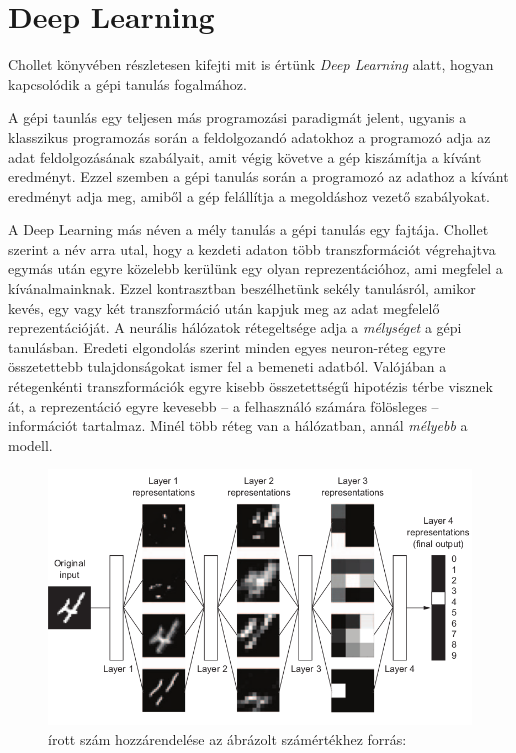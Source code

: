 \section{Deep Learning}
Chollet könyvében részletesen kifejti mit is értünk \emph{Deep Learning} alatt, hogyan kapcsolódik a gépi tanulás fogalmához.\cite{chollet}

A gépi taunlás egy teljesen más programozási paradigmát jelent, ugyanis a klasszikus programozás során a feldolgozandó adatokhoz a programozó adja az adat feldolgozásának szabályait, amit végig követve a gép kiszámítja a kívánt eredményt. Ezzel szemben a gépi tanulás során a programozó az adathoz  a kívánt eredményt adja meg, amiből a gép felállítja a megoldáshoz vezető szabályokat.%

A Deep Learning más néven a mély tanulás a gépi tanulás egy fajtája. Chollet szerint a név arra utal, hogy a kezdeti adaton több transzformációt végrehajtva egymás után egyre közelebb kerülünk egy olyan reprezentációhoz, ami megfelel a kívánalmainknak. Ezzel kontrasztban beszélhetünk sekély tanulásról, amikor kevés, egy vagy két transzformáció után kapjuk meg az adat megfelelő reprezentációját.%
A neurális hálózatok rétegeltsége adja a \emph{mélységet} a gépi tanulásban. Eredeti elgondolás szerint minden egyes neuron-réteg egyre összetettebb tulajdonságokat ismer fel a bemeneti adatból. Valójában a rétegenkénti transzformációk egyre kisebb összetettségű hipotézis térbe visznek át, a reprezentáció egyre kevesebb -- a felhasználó számára fölösleges -- információt tartalmaz. Minél több réteg van a hálózatban, annál \emph{mélyebb} a modell.

\begin{figure}[h]
	\centering
	\includegraphics[width=0.8\columnwidth]{fig/digit_classification.png}
	\caption{írott szám hozzárendelése az ábrázolt számértékhez \footnotesize forrás:\cite{chollet}}
	\label{fig:digit_classification}
\end{figure}

